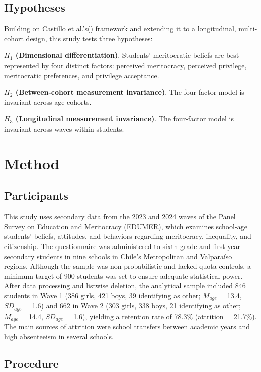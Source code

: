 \documentclass[
  13pt,
]{article}
\begin{document}
\subsection{Hypotheses}\label{hypotheses}

Building on Castillo et
al.'s() framework and
extending it to a longitudinal, multi-cohort design, this study tests
three hypotheses:

\textbf{\(H_1\) (Dimensional differentiation)}. Students' meritocratic
beliefs are best represented by four distinct factors: perceived
meritocracy, perceived privilege, meritocratic preferences, and
privilege acceptance.

\textbf{\(H_2\) (Between-cohort measurement invariance)}. The
four-factor model is invariant across age cohorts.

\textbf{\(H_3\) (Longitudinal measurement invariance)}. The four-factor
model is invariant across waves within students.

\section{Method}\label{method}

\subsection{Participants}\label{participants}

This study uses secondary data from the 2023 and 2024 waves of the Panel
Survey on Education and Meritocracy (EDUMER), which examines school-age
students' beliefs, attitudes, and behaviors regarding meritocracy,
inequality, and citizenship. The questionnaire was administered to
sixth-grade and first-year secondary students in nine schools in Chile's
Metropolitan and Valparaíso regions. Although the sample was
non-probabilistic and lacked quota controls, a minimum target of 900
students was set to ensure adequate statistical power. After data
processing and listwise deletion, the analytical sample included 846
students in Wave 1 (386 girls, 421 boys, 39 identifying as other;
\(M_{age}\) = 13.4, \(SD_{age}\) = 1.6) and 662 in Wave 2 (303 girls,
338 boys, 21 identifying as other; \(M_{age}\) = 14.4, \(SD_{age}\) =
1.6), yielding a retention rate of 78.3\% (attrition = 21.7\%). The main
sources of attrition were school transfers between academic years and
high absenteeism in several schools.

\subsection{Procedure}\label{procedure}
\end{document}

